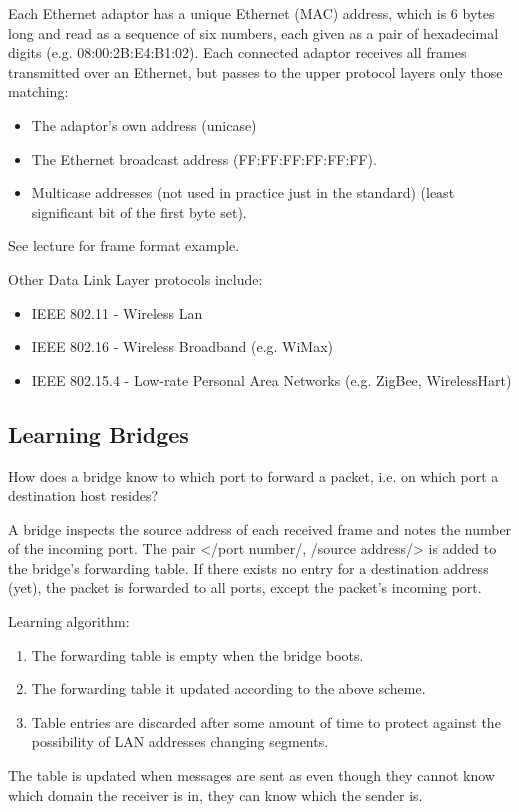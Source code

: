 \documentclass{article}%
\begin{document}
Each Ethernet adaptor has a unique Ethernet (MAC) address, which is 6 bytes long and read as a sequence of six numbers, each given as a pair of hexadecimal digits (e.g. 08:00:2B:E4:B1:02).
Each connected adaptor receives all frames transmitted over an Ethernet, but passes to the upper protocol layers only those matching:
\begin{itemize}
\item The adaptor's own address (unicase)
\item The Ethernet broadcast address (FF:FF:FF:FF:FF:FF).
\item Multicase addresses (not used in practice just in the standard) (least significant bit of the first byte set).
\end{itemize}
See lecture for frame format example.

Other Data Link Layer protocols include:
\begin{itemize}
\item IEEE 802.11 - Wireless Lan
\item IEEE 802.16 - Wireless Broadband (e.g. WiMax)
\item IEEE 802.15.4 - Low-rate Personal Area Networks (e.g. ZigBee, WirelessHart)
\end{itemize}

\subsection{Learning Bridges}
\label{sec:org7a0c83d}
How does a bridge know to which port to forward a packet, i.e. on which port a destination host resides?

A bridge inspects the source address of each received frame and notes the number of the incoming port.
The pair </port number/, /source address/> is added to the bridge's forwarding table.
If there exists no entry for a destination address (yet), the packet is forwarded to all ports, except the packet's incoming port.

Learning algorithm:
\begin{enumerate}
\item The forwarding table is empty when the bridge boots.
\item The forwarding table it updated according to the above scheme.
\item Table entries are discarded after some amount of time to protect against the possibility of LAN addresses changing segments.
\end{enumerate}
The table is updated when messages are sent as even though they cannot know which domain the receiver is in, they can know which the sender is.
\end{document}
